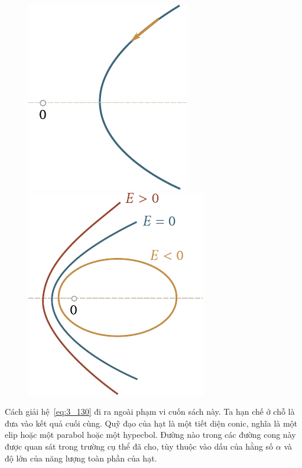 \begin{figure}[!htb]
	\begin{minipage}[t]{0.5\linewidth}
		\begin{center}
			\includegraphics[scale=1]{figures/ch_03/fig_3_28.pdf}
			\caption[]{}
			\label{fig:3_28}
		\end{center}
	\end{minipage}
	\hspace{-0.2cm}
	\begin{minipage}[t]{0.5\linewidth}
		\begin{center}
			\includegraphics[scale=1]{figures/ch_03/fig_3_29.pdf}
			\caption[]{}
			\label{fig:3_29}
		\end{center}
	\end{minipage}
\end{figure}

Cách giải hệ~\eqref{eq:3_130} đi ra ngoài phạm vi cuốn sách này. Ta hạn chế ở chỗ là đưa vào kết quả cuối cùng. Quỹ đạo của hạt là một tiết diện conic, nghĩa là một elip hoặc một parabol hoặc một hypecbol. Đường nào trong các đường cong này được quan sát trong trường cụ thể đã cho, tùy thuộc vào dấu của hằng số $\alpha$ và độ lớn của năng lượng toàn phần của hạt.

